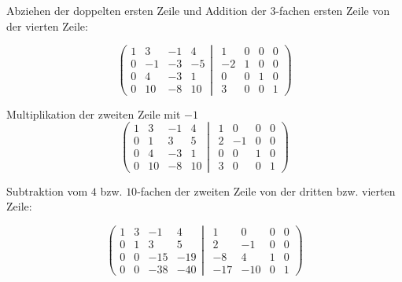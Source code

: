 \documentclass[a4paper,german,12pt,smallheadings]{scrartcl}
\begin{document}
Abziehen der doppelten ersten Zeile und Addition der $3$-fachen ersten Zeile von der vierten Zeile:

\begin{equation*}
\left(
 \begin{matrix}
 1 & 3 & -1 & 4 \\
 0 & -1 & -3 & -5 \\
 0 & 4 & -3 & 1 \\
 0 & 10 & -8 & 10
 \end{matrix}
 \left|
  \hspace{5pt}
  \begin{matrix}
  1 & 0 & 0 & 0 \\
  -2 & 1 & 0 & 0 \\
  0 & 0 & 1 & 0 \\
  3 & 0 & 0 & 1
  \end{matrix}
 \right)
\right.
\end{equation*}

Multiplikation der zweiten Zeile mit $-1$
\begin{equation*}
\left(
 \begin{matrix}
 1 & 3 & -1 & 4 \\
 0 & 1 & 3 & 5 \\
 0 & 4 & -3 & 1 \\
 0 & 10 & -8 & 10
 \end{matrix}
 \left|
  \hspace{5pt}
  \begin{matrix}
  1 & 0 & 0 & 0 \\
  2 & -1 & 0 & 0 \\
  0 & 0 & 1 & 0 \\
  3 & 0 & 0 & 1
  \end{matrix}
 \right)
\right.
\end{equation*}

Subtraktion vom $4$ bzw. $10$-fachen der zweiten Zeile von der dritten bzw. vierten Zeile:

\begin{equation*}
\left(
 \begin{matrix}
 1 & 3 & -1 & 4 \\
 0 & 1 & 3 & 5 \\
 0 & 0 & -15 & -19 \\
 0 & 0 & -38 & -40
 \end{matrix}
 \left|
  \hspace{5pt}
  \begin{matrix}
  1 & 0 & 0 & 0 \\
  2 & -1 & 0 & 0 \\
  -8 & 4 & 1 & 0 \\
  -17 & -10 & 0 & 1
  \end{matrix}
 \right)
\right.
\end{equation*}
\end{document}
